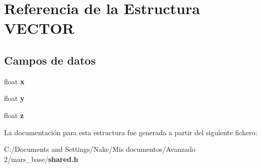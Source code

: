 \section{Referencia de la Estructura VECTOR}
\label{struct_v_e_c_t_o_r}
\subsection*{Campos de datos}
\begin{DoxyCompactItemize}
\item 
float {\bfseries x}\label{struct_v_e_c_t_o_r_ad0da36b2558901e21e7a30f6c227a45e}

\item 
float {\bfseries y}\label{struct_v_e_c_t_o_r_aa4f0d3eebc3c443f9be81bf48561a217}

\item 
float {\bfseries z}\label{struct_v_e_c_t_o_r_af73583b1e980b0aa03f9884812e9fd4d}

\end{DoxyCompactItemize}


La documentación para esta estructura fue generada a partir del siguiente fichero:\begin{DoxyCompactItemize}
\item 
C:/Documents and Settings/Nake/Mis documentos/Avanzado 2/mars\_\-base/{\bf shared.h}\end{DoxyCompactItemize}
